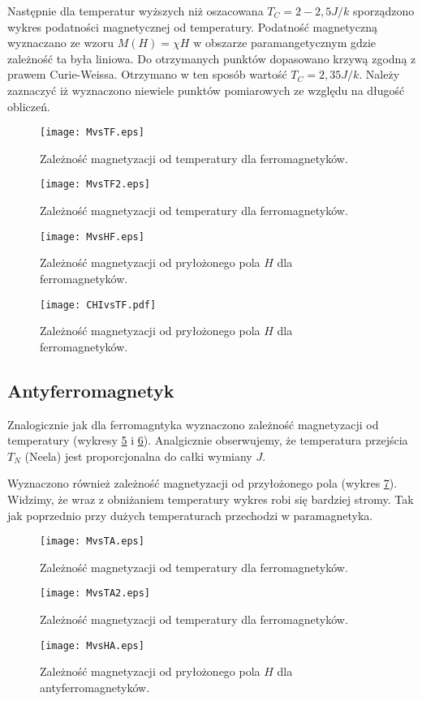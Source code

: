 \documentclass[11pt]{article}
\begin{document}
Następnie dla temperatur wyższych niż oszacowana $T_C = 2-2,5 J/k$ sporządzono 
wykres podatności magnetycznej od temperatury. Podatność magnetyczną 
wyznaczano ze wzoru $M (H) = \chi H$ w obszarze paramangetycznym 
gdzie zależność ta była liniowa. Do otrzymanych punktów dopasowano 
krzywą zgodną z prawem Curie-Weissa. Otrzymano w ten sposób wartość 
$T_C = 2,35 J/k$. Należy zaznaczyć iż wyznaczono niewiele punktów pomiarowych 
ze względu na długość obliczeń. 

\begin{figure}
\centering
\texttt{[image: MvsTF.eps]}
\caption{Zależność magnetyzacji od temperatury dla ferromagnetyków.}{\label{MvsTF}}
\end{figure}
\begin{figure}
\centering
\texttt{[image: MvsTF2.eps]}
\caption{Zależność magnetyzacji od temperatury dla ferromagnetyków.}{\label{MvsTF2}}
\end{figure}
\begin{figure}
\centering
\texttt{[image: MvsHF.eps]}
\caption{Zależność magnetyzacji od pryłożonego pola 
$H$ dla ferromagnetyków.}{\label{MvsHF}}
\end{figure}
\begin{figure}
\centering
\texttt{[image: CHIvsTF.pdf]}
\caption{Zależność magnetyzacji od pryłożonego pola 
$H$ dla ferromagnetyków.}{\label{MvsHF}}
\end{figure}


\subsection*{Antyferromagnetyk}
Znalogicznie jak dla ferromagntyka wyznaczono zależność magnetyzacji od temperatury
(wykresy \ref{MvsTA} i \ref{MvsTA2}).
Analgicznie obserwujemy, że temperatura przejścia $T_N$ (Neela) jest proporcjonalna 
do całki wymiany $J$.

Wyznaczono również zależność magnetyzacji od przyłożonego pola (wykres \ref{MvsHA}).
Widzimy, że wraz z obniżaniem temperatury wykres robi się bardziej stromy. Tak jak poprzednio
przy dużych temperaturach przechodzi w paramagnetyka.

\begin{figure}
\centering
\texttt{[image: MvsTA.eps]}
\caption{Zależność magnetyzacji od temperatury dla ferromagnetyków.}{\label{MvsTA}}
\end{figure}
\begin{figure}
\centering
\texttt{[image: MvsTA2.eps]}
\caption{Zależność magnetyzacji od temperatury dla ferromagnetyków.}{\label{MvsTA2}}
\end{figure}
\begin{figure}
\centering
\texttt{[image: MvsHA.eps]}
\caption{Zależność magnetyzacji od pryłożonego pola 
$H$ dla antyferromagnetyków.}{\label{MvsHA}}
\end{figure}
\end{document}
